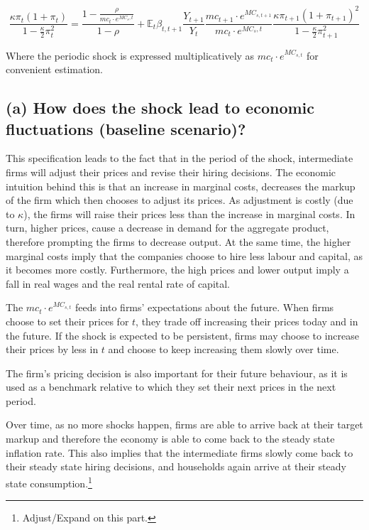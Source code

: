 \documentclass[12pt]{article}
\begin{document}
\begin{equation}\label{eq:phillips_curve}
    \frac{\kappa \pi_t (1 + \pi_t)}{1 - \frac{\kappa}{2} \pi_t^2}
    = \frac{1 - \frac{\rho}{mc_t \cdot e^{MC_s,t}}}{1 - \rho}
    + \mathbb{E}_t \beta_{t,t+1}
    \frac{Y_{t+1}}{Y_t}
    \frac{mc_{t+1} \cdot e^{MC_{s,t+1}}}{mc_t \cdot e^{MC_s,t}}
    \frac{\kappa \pi_{t+1} (1 + \pi_{t+1})^{2}}{1 - \frac{\kappa}{2} \pi_{t+1}^2}
\end{equation}

Where the periodic shock is expressed multiplicatively as $mc_t \cdot e^{MC_{s, t}}$ for convenient estimation.

\subsection*{(a) How does the shock lead to economic fluctuations (baseline scenario)?}

This specification leads to the fact that in the period of the shock, intermediate firms will adjust their prices and revise their hiring decisions. The economic intuition behind this is that an increase in marginal costs, decreases the markup of the firm which then chooses to adjust its prices. As adjustment is costly (due to $\kappa$), the firms will raise their prices less than the increase in marginal costs. In turn, higher prices, cause a decrease in demand for the aggregate product, therefore prompting the firms to decrease output. At the same time, the higher marginal costs imply that the companies choose to hire less labour and capital, as it becomes more costly. Furthermore, the high prices and lower output imply a fall in real wages and the real rental rate of capital.

The $mc_t \cdot e^{MC_{s, t}}$ feeds into firms' expectations about the future. When firms choose to set their prices for $t$, they trade off increasing their prices today and in the future. If the shock is expected to be persistent, firms may choose to increase their prices by less in $t$ and choose to keep increasing them slowly over time. 

The firm's pricing decision is also important for their future behaviour, as it is used as a benchmark relative to which they set their next prices in the next period. 

Over time, as no more shocks happen, firms are able to arrive back at their target markup and therefore the economy is able to come back to the steady state inflation rate. This also implies that the intermediate firms slowly come back to their steady state hiring decisions, and households again arrive at their steady state consumption.\footnote{Adjust/Expand on this part.}
\end{document}
